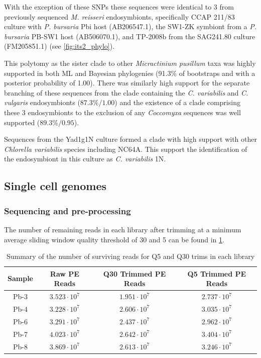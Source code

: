 With the exception of these SNPs these sequences were identical to 3 from previously sequenced \textit{M. reisseri} endosymbionts, 
specifically CCAP 211/83 culture with \textit{P. bursaria} Pbi host (AB206547.1), the SW1-ZK symbiont from a \textit{P. bursaria} PB-SW1 host (AB506070.1),
and TP-2008b from the SAG241.80 culture (FM205851.1) (see \cref{fig:its2_phylo}).

This polytomy as the sister clade to other \textit{Micractinium pusillum} 
taxa was highly supported in both ML and Bayesian phylogenies (91.3\% of 
bootstraps and with a posterior probability of 1.00).
There was similarly high support for the separate branching of these sequences
from the clade containing the \textit{C. variabilis} and \textit{C. vulgaris} 
endosymbionts (\(87.3\%/1.00\)) and the existence of a clade comprising these 3
endosymbionts to the exclusion of any \textit{Coccomyxa} sequences was well supported
(\(89.3\%/0.95\)). 

Sequences from the Yad1g1N culture formed a clade with high support 
with other \textit{Chlorella variabilis} species including NC64A.
This support the identification of the endosymbiont in this culture
as \textit{C. variabilis} 1N.



\subsection{Single cell genomes}

\subsubsection{Sequencing and pre-processing}

The number of remaining reads in each library after trimming at a minimum average 
sliding window quality threshold of 30 and 5 can be found in \cref{tab:genome_trim}.

\begin{table}
    \centering
    \begin{tabular}{|c|c|c|c|}
        \hline
        \textbf{Sample} & \textbf{Raw PE Reads} & \textbf{Q30 Trimmed PE Reads} & \textbf{Q5 Trimmed PE Reads}\\
        \hline
        Pb-3 & \(3.523\cdot10^7\) & \(1.951\cdot10^7\) & \(2.737\cdot10^7\) \\
        Pb-4 & \(3.228\cdot10^7\) & \(2.606\cdot10^7\) & \(3.035\cdot10^7\) \\
        Pb-6 & \(3.291\cdot10^7\) & \(2.437\cdot10^7\) & \(2.962\cdot10^7\) \\
        Pb-7 & \(4.023\cdot10^7\) & \(2.642\cdot10^7\) & \(3.404\cdot10^7\) \\
        Pb-8 & \(3.869\cdot10^7\) & \(2.613\cdot10^7\) & \(3.246\cdot10^7\) \\
        \hline
    \end{tabular}
    \caption[The effect of read trimming threshold across libraries]{Summary of the number
    of surviving reads for Q5 and Q30 trims in each library}
    \label{tab:genome_trim}
\end{table}


